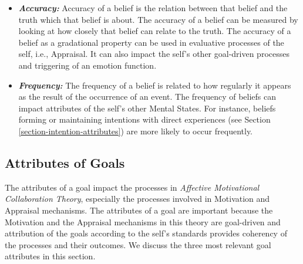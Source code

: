 \documentclass[12pt]{report}
\begin{document}
\begin{itemize}
  \item \textbf{\textit{Accuracy:}} Accuracy of a belief is the relation between
  that belief and the truth which that belief is about. The accuracy of a belief
  can be measured by looking at how closely that belief can relate to the truth.
  The accuracy of a belief as a gradational property can be used in evaluative
  processes of the self, i.e., Appraisal. It can also impact the self's other
  goal-driven processes and triggering of an emotion function.
  
  \item \textbf{\textit{Frequency:}} The frequency of a belief is related to how
  regularly it appears as the result of the occurrence of an event. The
  frequency of beliefs can impact attributes of the self's other Mental States.
  For instance, beliefs forming or maintaining intentions with direct
  experiences (see Section \ref{section-intention-attributes}) are more likely
  to occur frequently.
\end{itemize}

\subsection{Attributes of Goals}
\label{section-goal-attributes}

The attributes of a goal impact the processes in \textit{Affective Motivational
Collaboration Theory}, especially the processes involved in Motivation and
Appraisal mechanisms. The attributes of a goal are important because the
Motivation and the Appraisal mechanisms in this theory are goal-driven and
attribution of the goals according to the self's standards provides coherency of
the processes and their outcomes. We discuss the three most relevant goal
attributes in this section.
\end{document}
